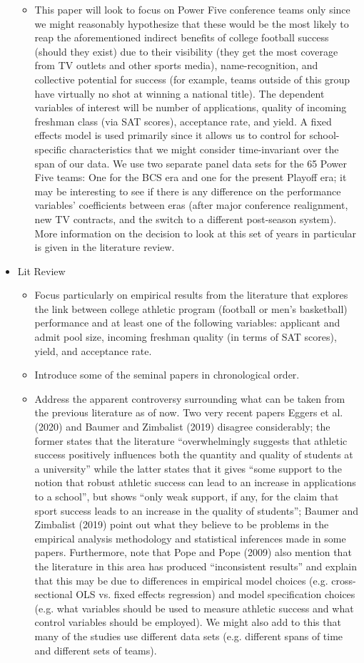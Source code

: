 \documentclass[12pt,english]{article}
\begin{document}
\begin{itemize}
\begin{itemize}
    \item This paper will look to focus on Power Five conference teams only since we might reasonably hypothesize that these would be the most likely to reap the aforementioned indirect benefits of college football success (should they exist) due to their visibility (they get the most coverage from TV outlets and other sports media), name-recognition, and collective potential for success (for example, teams outside of this group have virtually no shot at winning a national title). The dependent variables of interest will be number of applications, quality of incoming freshman class (via SAT scores), acceptance rate, and yield. A fixed effects model is used primarily since it allows us to control for school-specific characteristics that we might consider time-invariant over the span of our data. We use two separate panel data sets for the 65 Power Five teams: One for the BCS era and one for the present Playoff era; it may be interesting to see if there is any difference on the performance variables' coefficients between eras (after major conference realignment, new TV contracts, and the switch to a different post-season system). More information on the decision to look at this set of years in particular is given in the literature review.
    \end{itemize}
\item Lit Review
    \begin{itemize}
    \item Focus particularly on empirical results from the literature that explores the link between college athletic program (football or men's basketball) performance and at least one of the following variables: applicant and admit pool size, incoming freshman quality (in terms of SAT scores), yield, and acceptance rate.
    \item Introduce some of the seminal papers in chronological order.
    \item Address the apparent controversy surrounding what can be taken from the previous literature as of now. Two very recent papers Eggers et al. (2020) and Baumer and Zimbalist (2019) disagree considerably; the former states that the literature ``overwhelmingly suggests that athletic success positively influences both the quantity and quality of students at a university'' while the latter states that it gives ``some support to the notion that robust athletic success can lead to an increase in applications to a school'', but shows ``only weak support, if any, for the claim that sport success leads to an increase in the quality of students''; Baumer and Zimbalist (2019) point out what they believe to be problems in the empirical analysis methodology and statistical inferences made in some papers. Furthermore, note that Pope and Pope (2009) also mention that the literature in this area has produced ``inconsistent results'' and explain that this may be due to differences in empirical model choices (e.g. cross-sectional OLS vs. fixed effects regression) and model specification choices (e.g. what variables should be used to measure athletic success and what control variables should be employed). We might also add to this that many of the studies use different data sets (e.g. different spans of time and different sets of teams).

\end{itemize}
\end{itemize}
\end{document}

